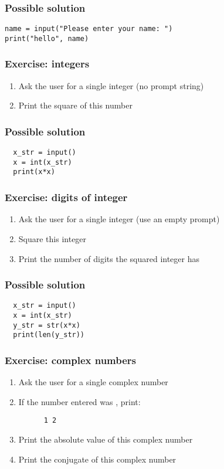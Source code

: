 \documentclass[14pt,compress]{beamer}
\begin{document}
\begin{frame}
\frametitle{Possible solution}
\begin{lstlisting}
name = input("Please enter your name: ")
print("hello", name)
\end{lstlisting}

\end{frame}

\begin{frame}[plain]
  \frametitle{Exercise: integers}
  \begin{enumerate}
  \item Ask the user for a single integer (no prompt string)
  \item Print the square of this number
  \end{enumerate}
\end{frame}

\begin{frame}
\frametitle{Possible solution}
\begin{lstlisting}
  x_str = input()
  x = int(x_str)
  print(x*x)
\end{lstlisting}

\end{frame}


\begin{frame}[plain]
  \frametitle{Exercise: digits of integer}
  \begin{enumerate}
  \item Ask the user for a single integer (use an empty prompt)
  \item Square this integer
  \item Print the number of digits the squared integer has
  \end{enumerate}
\end{frame}

\begin{frame}
\frametitle{Possible solution}
\begin{lstlisting}
  x_str = input()
  x = int(x_str)
  y_str = str(x*x)
  print(len(y_str))
\end{lstlisting}

\end{frame}

\begin{frame}
  \frametitle{Exercise: complex numbers}
  \begin{enumerate}
  \item Ask the user for a single complex number
  \item If the number entered was , print:
    \begin{lstlisting}
      1 2
    \end{lstlisting}
  \item Print the absolute value of this complex number
  \item Print the conjugate of this complex number
  \end{enumerate}
\end{frame}
\end{document}
